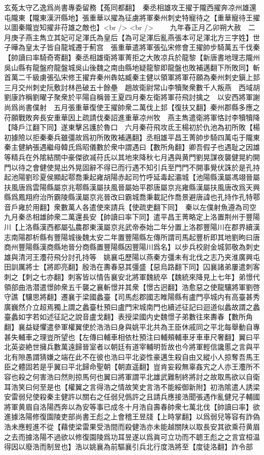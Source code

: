 玄菟太守乙逸爲尚書專委留務【菟同都翻】　秦丞相雄攻王擢于隴西擢奔凉州雄還屯隴東【隴東漢汧縣地】張重華以擢為征虜將軍秦州刺史特寵待之【重華寵待王擢以圖秦隴豈知擢非苻雄之敵也】<br />
<br />
　　九年春正月乙卯朔大赦　二月庚子燕主雋立其妃可足渾氏為皇后【為可足渾后亂燕張本可足渾北方三字姓】世子曄為皇太子皆自龍城遷于薊宫　張重華遣將軍張弘宋修會王擢帥步騎萬五千伐秦【帥讀曰率騎奇寄翻】秦丞相雄衛將軍菁拒之大敗凉兵於龍黎【新唐書地理志隴州吳山縣有龍盤府龍盤城吳山後魏之南由縣地疑龍黎即龍盤也敗補邁翻下所敗同】斬首萬二千級虜張弘宋修王擢弃秦州犇姑臧秦主健以領軍將軍苻願為秦州刺史鎭上邽　三月交州刺史阮敷討林邑破五十餘壘　趙故衛尉常山李犢聚衆數千人叛燕　西域胡劉康詐稱劉曜子聚衆於平陽自稱晉王夏四月秦左衛將軍苻飛討擒之　以安西將軍謝尚爲尚書僕射　五月張重華復使王擢帥衆二萬伐上邽【復扶又翻】秦州郡縣多應之苻願戰敗奔長安重華因上疏請伐秦詔進重華凉州牧　燕主雋遣衛將軍恪討李犢犢降【降戶江翻下同】遂東擊呂護於魯口　六月秦苻飛攻氐王楊初於仇池為初所敗【楊初據險以拒秦秦兵雖彊故爲初所敗敗補邁翻】丞相雄平昌王菁帥步騎四萬屯于隴東秦主健納張遇繼母韓氏爲昭儀數於衆中謂遇曰【數所角翻】卿吾假子也遇耻之因雄等精兵在外隂結關中豪傑欲㓕苻氏以其地來降秋七月遇與黄門劉晃謀夜襲健晃約開門以待之會健使晃出外晃固辭不得已而行遇不知引兵至門門不開事覺伏誅於是孔持起池陽劉珍夏侯顯起鄠喬秉起雍胡陽赤起司竹呼延毒起灞城【池陽縣漢屬馮翊晉屬扶風唐爲雲陽縣屬京兆鄠縣漢屬扶風晉屬始平郡唐屬京兆雍縣漢屬扶風唐改爲天興縣爲鳳翔府治所霸陵縣漢屬京兆晉改曰霸城喬秉載記作喬景避唐諱也孔持作孔特鄠音戶雍於用翻】衆數萬人各遣使來請兵【使疏吏翻下同】　秦以左僕射魚遵為司空　九月秦丞相雄帥衆二萬還長安【帥讀曰率下同】遣平昌王菁略定上洛置荆州于豐陽川【上洛縣漢西都屬弘農郡東漢屬京兆武帝泰始二年分置上洛郡豐陽川在郡界續漢志南陽郡析縣有豐陽城後魏太安二年置豐陽縣左傳所謂司馬起豐析即其地劉昫曰唐商州豐陽縣漢商縣地晉分商縣置豐陽縣因豐陽川爲名】以步兵校尉金城郭敬為刺史雄與清河王灋苻飛分討孔持等　姚襄屯歷陽以燕秦方彊未有北伐之志乃夹淮廣興屯田訓厲將士【將即亮翻】殷浩在夀春惡其彊盛【惡烏路翻下同】囚襄諸弟屢遣刺客刺之【刺之七亦翻】刺客皆以情告襄安北將軍魏統卒【魏統來降見上七年】弟憬代領部曲浩潜遣憬帥衆五千襲之襄斬憬并其衆【憬古迥翻】浩愈惡之使龍驤將軍劉啓守譙【驤思將翻】遷襄于梁國蠡臺【司馬彪郡國志睢陽縣有盧門亭城内有高臺甚秀廣巍然介立超焉獨上謂之蠡臺杜預曰盧門宋城南門也續述征記曰迴道似蠡故謂之蠡臺蠡如字若如述征記之說音盧戈翻】表授梁國内史魏憬子弟數往來夀春【數所角翻】襄益疑懼遣參軍權翼使於浩浩曰身與姚平北共為王臣休戚同之平北每舉動自專甚失輔車之理豈所望也【左傳曰輔車相依杜預注曰輔頰輔車牙車車尺奢翻】翼曰平北英姿絶世擁兵數萬遠歸晉室者以朝廷有道宰輔明哲故也今將軍輕信讒慝之言與平北有隙愚謂猜嫌之端在此不在彼也浩曰平北姿性豪邁生殺自由又縱小人掠奪吾馬王臣之體固若是乎翼曰平北歸命聖朝【朝直遥翻】豈肯妄殺無辜姦宄之人亦王灋所不容也殺之何害浩曰然則掠馬何也翼曰將軍謂平北雄武難制終將討之故取馬欲以自衛耳浩笑曰何至是也【權翼之言得浩之情故笑史言浩不能綏御新附】初浩隂遣人誘梁安雷弱兒使殺秦主健許以關右之任弱兒僞許之且請兵應接浩聞張遇作亂健兄子輔國將軍黄眉自洛陽西奔以為安等事已成冬十月浩自壽春帥衆七萬北伐【帥讀曰率】欲進據洛陽修復園陵吏部尚書王彪之上會稽王昱牋【上時掌翻】以爲弱兒等容有詐偽浩未應輕進不從【藉使梁雷果受浩間而殺健浩亦未能越關陕以取長安其欲乘苻黄眉之去而據洛陽不過欲以修復園陵爲功耳昱遂以爲眞可立功而不聼王彪之之言宜桓温得因以廢浩而制昱也】浩以姚襄為前驅襄引兵北行度浩將至【度徒洛翻】詐令部